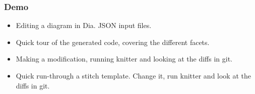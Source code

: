 \documentclass{beamer}
\begin{document}
\begin{frame}
\frametitle{Demo}

\begin{itemize}

\item Editing a diagram in Dia. JSON input files.

\pause

\item Quick tour of the generated code, covering the different
  facets.

\pause

\item Making a modification, running knitter and looking at the diffs
  in git.

\pause

\item Quick run-through a stitch template. Change it, run knitter and
  look at the diffs in git.

\end{itemize}

\end{frame}

\begin{frame}
  \printbibliography
\end{frame}
\end{document}
